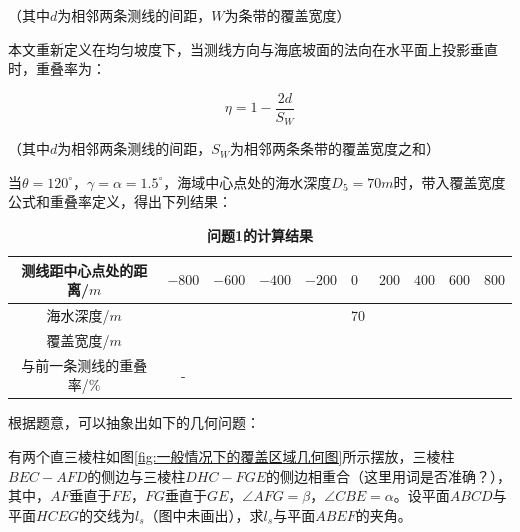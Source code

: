 （其中$d$为相邻两条测线的间距，$W$为条带的覆盖宽度）

本文重新定义在均匀坡度下，当测线方向与海底坡面的法向在水平面上投影垂直时，重叠率为：

\begin{equation}
    \eta = 1-\frac{2d}{S_W}
\end{equation}

（其中$d$为相邻两条测线的间距，$S_W$为相邻两条条带的覆盖宽度之和）

当$\theta = 120^\circ$，$\gamma=\alpha=1.5^\circ$，海域中心点处的海水深度$D_5 = 70m$时，带入覆盖宽度公式和重叠率定义，得出下列结果：

\begin{table}[h]
    \centering
    \caption{\textbf{问题1的计算结果}}
    \begin{tabular}{@{}ccllllllll@{}}
    \toprule
    测线距中心点处的距离/$m$  & $-800$ & $-600$ & $-400$ & $-200$ & $0$ & $200$ & $400$ & $600$ & $800$ \\ \midrule
    海水深度/$m$        &      &      &      &      & 70  &     &     &     &     \\
    覆盖宽度/$m$        &      &      &      &      &   &     &     &     &     \\
    与前一条测线的重叠率/$\%$ &   -  &      &      &      &   &     &     &     &     \\ \bottomrule
    \end{tabular}
\end{table}



根据题意，可以抽象出如下的几何问题：

有两个直三棱柱如图\ref{fig:一般情况下的覆盖区域几何图}所示摆放，三棱柱$BEC-AFD$的侧边与三棱柱$DHC-FGE$的侧边相重合（这里用词是否准确？），其中，$AF$垂直于$FE$，$FG$垂直于$GE$，$\angle AFG=\beta$，$\angle CBE=\alpha$。设平面$ABCD$与平面$HCEG$的交线为$l_s$（图中未画出），求$l_s$与平面$ABEF$的夹角。

